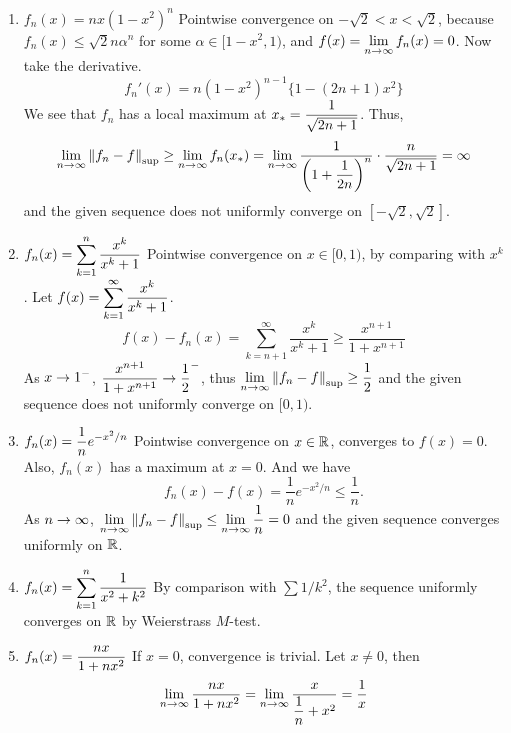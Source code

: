 \begin{enumerate}
    \item \(f_n(x) = nx(1-x^2)^n\) \newline
          Pointwise convergence on \(-\sqrt{2} < x < \sqrt{2}\), because \(f_n(x) \leq \sqrt{2}n\alpha^n\) for some \(\alpha \in [1-x^2, 1)\), and \(f(x) = \displaystyle \lim_{n \rightarrow \infty} f_n(x) = 0\). Now take the derivative.
          \[
              f_n'(x) = n(1-x^2)^{n-1}\{1 - (2n+1)x^2\}
          \]
          We see that \(f_n\) has a local maximum at \(\displaystyle x_\ast = \frac{1}{\sqrt{2n+1}}\). Thus,
          \[
              \lim_{n\rightarrow\infty} \left\lVert f_n-f\right\rVert_{\sup} \geq \lim_{n \rightarrow \infty} f_n(x_\ast) = \lim_{n \rightarrow \infty} \frac{1}{\left(1 + \dfrac{1}{2n}\right)^n}\cdot \frac{n}{\sqrt{2n+1}} = \infty
          \]
          and the given sequence does not uniformly converge on \([-\sqrt{2}, \sqrt{2}]\).
    \item \(f_n(x) = \displaystyle \sum_{k=1}^{n} \frac{x^k}{x^k + 1}\) \newline
          Pointwise convergence on \(x\in [0, 1)\), by comparing with \(x^k\). Let \(f(x) = \displaystyle \sum_{k=1}^\infty \frac{x^k}{x^k+1}\).
          \[
              f(x) - f_n(x) = \sum_{k=n+1}^\infty \frac{x^k}{x^k+1}\geq \frac{x^{n+1}}{1+x^{n+1}}
          \]
          As \(x \rightarrow 1^-\), \(\displaystyle \frac{x^{n+1}}{1+x^{n+1}}\rightarrow \frac{1}{2}^-\), thus \(\displaystyle \lim_{n\rightarrow\infty} \left\lVert f_n-f\right\rVert_{\sup} \geq \frac{1}{2}\) and the given sequence does not uniformly converge on \([0, 1)\).
    \item \(f_n(x) = \displaystyle \frac{1}{n}e^{-x^2/n}\) \newline
          Pointwise convergence on \(x\in \mathbb{R}\), converges to \(f(x) = 0\). Also, \(f_n(x)\) has a maximum at \(x = 0\). And we have
          \[
              f_n(x) - f(x) = \frac{1}{n}e^{-x^2/n} \leq \frac{1}{n}.
          \]
          As \(n\rightarrow \infty\), \(\displaystyle \lim_{n \rightarrow \infty} \left\lVert f_n-f\right\rVert_{\sup} \leq \lim_{n \rightarrow \infty}\frac{1}{n} = 0\) and the given sequence converges uniformly on \(\mathbb{R}\).
    \item \(\displaystyle f_n(x) = \sum_{k=1}^n \frac{1}{x^2+k^2}\) \newline
          By comparison with \(\sum 1/k^2\), the sequence uniformly converges on \(\mathbb{R}\) by Weierstrass \(M\)-test.
    \item \(\displaystyle f_n(x) = \frac{nx}{1+nx^2}\) \newline
          If \(x = 0\), convergence is trivial. Let \(x \neq 0\), then
          \[
              \lim_{n \rightarrow \infty} \frac{nx}{1+nx^2} = \lim_{n \rightarrow \infty} \frac{x}{\dfrac{1}{n}+x^2} = \frac{1}{x}
\]
\end{enumerate}
